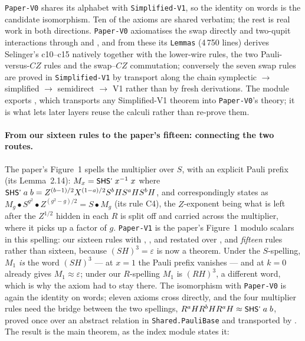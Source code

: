 \texttt{Paper-V0} shares its alphabet with \texttt{Simplified-V1}, so
the identity on words is the candidate isomorphism.  Ten of the axioms
are shared verbatim; the rest is real work in both
directions.  \texttt{Paper-V0} axiomatises the swap directly and
two-qupit interactions through  and
, and from these its \texttt{Lemmas} (4\,750 lines)
derives Selinger's c10--c15 natively together with the lower-wire
rules, the two Pauli-versus-$CZ$ rules and the swap--$CZ$ commutation;
conversely the seven swap rules are proved in \texttt{Simplified-V1} by
transport along the chain symplectic $\to$ simplified $\to$ semidirect
$\to$ V1 rather than by fresh derivations.  The module exports , which
transports any Simplified-V1 theorem into \texttt{Paper-V0}'s theory;
it is what lets later layers reuse the calculi rather than re-prove
them.

\paragraph{From our sixteen rules to the paper's fifteen: connecting
the two routes.}  The paper's Figure~1 spells the multiplier over
$S$, with an explicit Pauli prefix (its Lemma~2.14): $M_x =
\mbox{\textsf{\small SHS'}}\;x^{-1}\;x$ where $\mbox{\textsf{\small SHS'}}\;a\;b = Z^{(b-1)/2}
X^{(1-a)/2} S^{b} H S^{a} H S^{b} H$, and correspondingly states
 as
$M_g \bullet S^{g^2} \bullet Z^{(g^2-g)/2} = S \bullet M_g$ (its rule
C4), the $Z$-exponent being what is left after the $Z^{1/2}$ hidden in
each $R$ is split off and carried across the multiplier, where it picks
up a factor of $g$.  \texttt{Paper-V1} is the paper's Figure~1 modulo scalars in
this spelling: our sixteen rules with ,
,  and  restated over
, and \emph{fifteen} rules rather than sixteen, because
$(SH)^3 = \varepsilon$ is now a theorem.
Under the $S$-spelling, $M_1$ \emph{is} the word $(SH)^3$ --- at $x = 1$
the Pauli prefix vanishes --- and  at $k = 0$ already
gives $M_1 \approx \varepsilon$; under our $R$-spelling $M_1$ is
$(RH)^3$, a different word, which is why the axiom had to stay there.
The isomorphism with \texttt{Paper-V0} is again the identity on words;
eleven axioms cross directly, and the four multiplier rules need the
bridge between the two spellings, $R^{a}HR^{b}HR^{a}H \approx
\mbox{\textsf{\small SHS'}}\;a\;b$, proved once over an abstract relation in
\texttt{Shared.PauliBase} and transported by .  The result
is the main theorem, as the index module states it:

